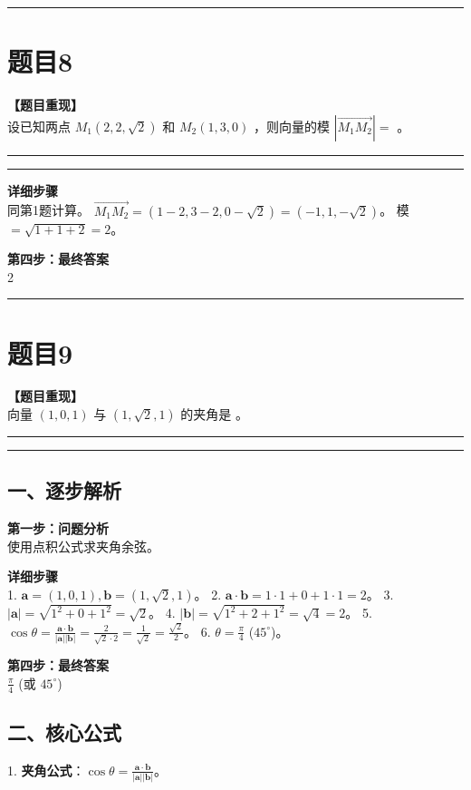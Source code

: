 \documentclass[12pt, a4paper]{ctexart}
\newcommand{\TopSeparator}{
    \par\noindent\rule{\textwidth}{1.5pt}\vspace{0.5em} %
}
\newcommand{\AnalysisSeparator}{
    \par\noindent\rule{\textwidth}{0.5pt}\vspace{0.2em}\hrule\vspace{0.5em} %
}
\newenvironment{RedAnalysis}{
    \par
    \color{red} %
}{
    \par
    \color{black} %
}
\begin{document}
\vspace{2em}

\TopSeparator
\section*{题目8}

\textbf{【题目重现】} \\
设已知两点 $ M_{1}(2,2,\sqrt{2}) $ 和 $ M_{2}(1,3,0) $ ，则向量的模 $ \left|\overrightarrow{M_{1}M_{2}}\right|= $ \underline{\hspace{2cm}}。

\AnalysisSeparator

\begin{RedAnalysis}

\textbf{详细步骤} \\
同第1题计算。
$\overrightarrow{M_1M_2} = (1-2, 3-2, 0-\sqrt{2}) = (-1, 1, -\sqrt{2})$。
模 $= \sqrt{1+1+2} = 2$。

\textbf{第四步：最终答案} \\
2

\end{RedAnalysis}

\vspace{2em}

\TopSeparator
\section*{题目9}

\textbf{【题目重现】} \\
向量 $ (1,0,1) $ 与 $ (1,\sqrt{2},1) $ 的夹角是 \underline{\hspace{2cm}}。

\AnalysisSeparator

\begin{RedAnalysis}

\subsection*{一、逐步解析}

\textbf{第一步：问题分析} \\
使用点积公式求夹角余弦。

\textbf{详细步骤} \\
1. $\mathbf{a}=(1,0,1), \mathbf{b}=(1,\sqrt{2},1)$。
2. $\mathbf{a} \cdot \mathbf{b} = 1\cdot1 + 0 + 1\cdot1 = 2$。
3. $|\mathbf{a}| = \sqrt{1^2+0+1^2} = \sqrt{2}$。
4. $|\mathbf{b}| = \sqrt{1^2+2+1^2} = \sqrt{4} = 2$。
5. $\cos \theta = \frac{\mathbf{a} \cdot \mathbf{b}}{|\mathbf{a}||\mathbf{b}|} = \frac{2}{\sqrt{2} \cdot 2} = \frac{1}{\sqrt{2}} = \frac{\sqrt{2}}{2}$。
6. $\theta = \frac{\pi}{4}$ ($45^\circ$)。

\textbf{第四步：最终答案} \\
$ \frac{\pi}{4} $ (或 $45^\circ$)

\subsection*{二、核心公式}
1. \textbf{夹角公式}：$\cos \theta = \frac{\mathbf{a} \cdot \mathbf{b}}{|\mathbf{a}||\mathbf{b}|}$。

\end{RedAnalysis}
\end{document}
